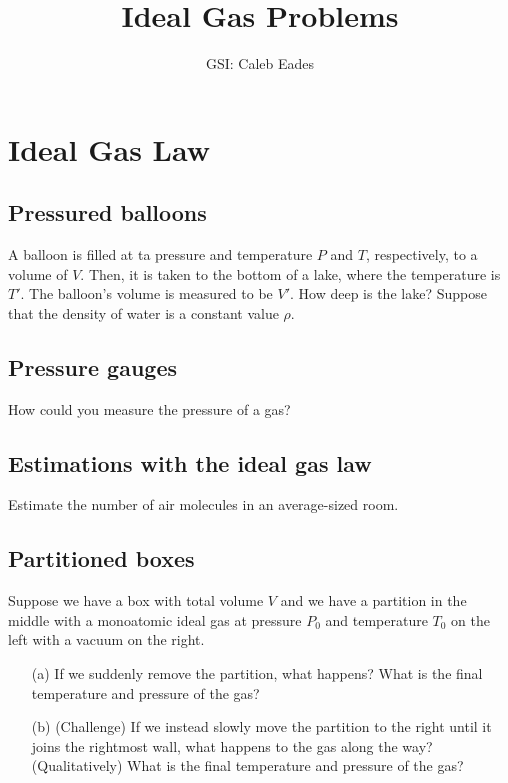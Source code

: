 \documentclass{article}
\begin{document}
	
\title{Ideal Gas Problems}
\author{GSI: Caleb Eades}
\maketitle

\section{Ideal Gas Law}

\subsection{Pressured balloons}

A balloon is filled at ta pressure and temperature $P$ and $T$, respectively, to a volume of $V$. Then, it is taken to the bottom of a lake, where the temperature is $T'$. The balloon's volume is measured to be $V'$. How deep is the lake? Suppose that the density of water is a constant value $\rho$.

\subsection{Pressure gauges}

How could you measure the pressure of a gas?

\subsection{Estimations with the ideal gas law}

Estimate the number of air molecules in an average-sized room.

\subsection{Partitioned boxes}

Suppose we have a box with total volume $V$ and we have a partition in the middle with a monoatomic ideal gas at pressure $P_0$ and temperature $T_0$ on the left with a vacuum on the right.
\begin{itemize}
	\item[(a)] If we suddenly remove the partition, what happens? What is the final temperature and pressure of the gas?
	\item[(b)] (Challenge) If we instead slowly move the partition to the right until it joins the rightmost wall, what happens to the gas along the way? (Qualitatively) What is the final temperature and pressure of the gas?
\end{itemize}
\end{document}
